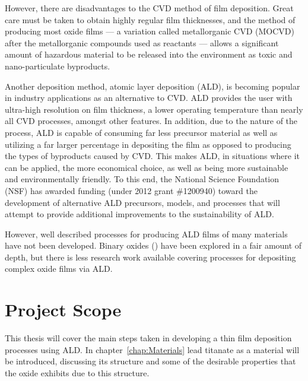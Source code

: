 However, there are disadvantages to the CVD method of film deposition. Great care must be taken to obtain highly regular film thicknesses, and the method of producing most oxide films --- a variation called metallorganic CVD (MOCVD) after the metallorganic compounds used as reactants --- allows a significant amount of hazardous material to be released into the environment as toxic and nano-particulate byproducts. 

Another deposition method, atomic layer deposition (ALD), is becoming popular in industry applications as an alternative to CVD. ALD provides the user with ultra-high resolution on film thickness, a lower operating temperature than nearly all CVD processes, amongst other features. In addition, due to the nature of the process, ALD is capable of consuming far less precursor material as well as utilizing a far larger percentage in depositing the film as opposed to producing the types of byproducts caused by CVD.\cite{ALD-Handbook} This makes ALD, in situations where it can be applied, the more economical choice, as well as being more sustainable and environmentally friendly. To this end, the National Science Foundation (NSF) has awarded funding (under 2012 grant \#1200940) toward the development of alternative ALD precursors, models, and processes that will attempt to provide additional improvements to the sustainability of ALD.

However, well described processes for producing ALD films of many materials have not been developed. Binary oxides () have been explored in a fair amount of depth,\cite{chen_atomic_2007,de_ridder_growth_2002,knez_atomic_2006,lee_al2o3_2003,scheffe_atomic_2009} but there is less research work available covering processes for depositing complex oxide films via ALD. 


\section{Project Scope}
\label{sec:Intro-Scope}

This thesis will cover the main steps taken in developing a thin film deposition processes using ALD. In chapter~\ref{chap:Materials} lead titanate as a material will be introduced, discussing its structure and some of the desirable properties that the oxide exhibits due to this structure. 

